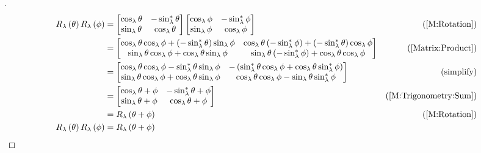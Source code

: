 \documentclass[../main.tex]{subfiles}
\begin{document}
\begin{proof}[]
\begin{align*}
R_\lambda\left(\theta\right)R_\lambda\left(\phi\right)
&=\begin{bmatrix}
\cos_\lambda{\theta}&-\sin_\lambda^\ast{\theta}\\
\sin_\lambda{\theta}&\cos_\lambda{\theta}\\
\end{bmatrix}
\begin{bmatrix}
\cos_\lambda{\phi}&-\sin_\lambda^\ast{\phi}\\
\sin_\lambda{\phi}&\cos_\lambda{\phi}\\
\end{bmatrix}
&\text{(\cref{M:Rotation})}\\
&=\begin{bmatrix}
\cos_\lambda{\theta}\cos_\lambda{\phi}+\left(-\sin_\lambda^\ast{\theta}\right)\sin_\lambda{\phi}&
\cos_\lambda{\theta}\left(-\sin_\lambda^\ast{\phi}\right)+\left(-\sin_\lambda^\ast{\theta}\right)\cos_\lambda{\phi}\\
\sin_\lambda{\theta}\cos_\lambda{\phi}+\cos_\lambda{\theta}\sin_\lambda{\phi}&
\sin_\lambda{\theta}\left(-\sin_\lambda^\ast{\phi}\right)+\cos_\lambda{\theta}\cos_\lambda{\phi}\\
\end{bmatrix}
&\text{(\cref{Matrix:Product})}\\
&=\begin{bmatrix}
\cos_\lambda{\theta}\cos_\lambda{\phi}-\sin_\lambda^\ast{\theta}\sin_\lambda{\phi}&
-\left(\sin_\lambda^\ast{\theta}\cos_\lambda{\phi}+\cos_\lambda{\theta}\sin_\lambda^\ast{\phi}\right)\\
\sin_\lambda{\theta}\cos_\lambda{\phi}+\cos_\lambda{\theta}\sin_\lambda{\phi}&
\cos_\lambda{\theta}\cos_\lambda{\phi}-\sin_\lambda{\theta}\sin_\lambda^\ast{\phi}\\
\end{bmatrix}
&\text{(simplify)}\\
&=\begin{bmatrix}
\cos_\lambda{\theta+\phi}&-\sin_\lambda^\ast{\theta+\phi}\\
\sin_\lambda{\theta+\phi}&\cos_\lambda{\theta+\phi}\\
\end{bmatrix}
&\text{(\cref{M:Trigonometry:Sum})}\\
&=R_\lambda\left(\theta+\phi\right)
&\text{(\cref{M:Rotation})}\\
R_\lambda\left(\theta\right)
R_\lambda\left(\phi\right)
&=R_\lambda\left(\theta+\phi\right)
&\qedhere
\end{align*}
\end{proof}
\end{document}
